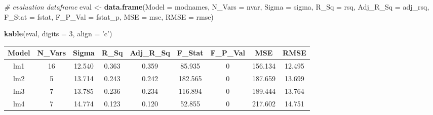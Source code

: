 \documentclass[]{article}
\newenvironment{Shaded}{\begin{snugshade}}{\end{snugshade}}
\newcommand{\CommentTok}[1]{\textcolor[rgb]{0.56,0.35,0.01}{\textit{#1}}}
\newcommand{\DataTypeTok}[1]{\textcolor[rgb]{0.13,0.29,0.53}{#1}}
\newcommand{\DecValTok}[1]{\textcolor[rgb]{0.00,0.00,0.81}{#1}}
\newcommand{\KeywordTok}[1]{\textcolor[rgb]{0.13,0.29,0.53}{\textbf{#1}}}
\newcommand{\NormalTok}[1]{#1}
\newcommand{\StringTok}[1]{\textcolor[rgb]{0.31,0.60,0.02}{#1}}
\begin{document}
\begin{Shaded}
\begin{Highlighting}[]
\CommentTok{# evaluation dataframe}
\NormalTok{eval <-}\StringTok{ }\KeywordTok{data.frame}\NormalTok{(}\DataTypeTok{Model =}\NormalTok{ modnames, }
                   \DataTypeTok{N_Vars =}\NormalTok{ nvar,}
                   \DataTypeTok{Sigma =}\NormalTok{ sigma,}
                   \DataTypeTok{R_Sq =}\NormalTok{ rsq,}
                   \DataTypeTok{Adj_R_Sq =}\NormalTok{ adj_rsq,}
                   \DataTypeTok{F_Stat =}\NormalTok{ fstat,}
                   \DataTypeTok{F_P_Val =}\NormalTok{ fstat_p,}
                   \DataTypeTok{MSE =}\NormalTok{ mse,}
                   \DataTypeTok{RMSE =}\NormalTok{ rmse)}

\KeywordTok{kable}\NormalTok{(eval, }\DataTypeTok{digits =} \DecValTok{3}\NormalTok{, }\DataTypeTok{align =} \StringTok{'c'}\NormalTok{)}
\end{Highlighting}
\end{Shaded}

\begin{longtable}[]{@{}ccccccccc@{}}
\toprule
Model & N\_Vars & Sigma & R\_Sq & Adj\_R\_Sq & F\_Stat & F\_P\_Val & MSE
& RMSE\tabularnewline
\midrule
\endhead
lm1 & 16 & 12.540 & 0.363 & 0.359 & 85.935 & 0 & 156.134 &
12.495\tabularnewline
lm2 & 5 & 13.714 & 0.243 & 0.242 & 182.565 & 0 & 187.659 &
13.699\tabularnewline
lm3 & 7 & 13.785 & 0.236 & 0.234 & 116.894 & 0 & 189.444 &
13.764\tabularnewline
lm4 & 7 & 14.774 & 0.123 & 0.120 & 52.855 & 0 & 217.602 &
14.751\tabularnewline
\bottomrule
\end{longtable}
\end{document}
